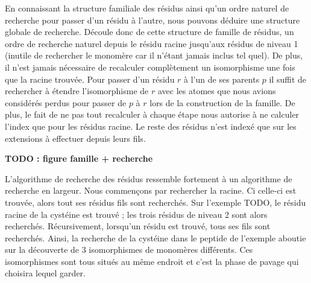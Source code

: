 En connaissant la structure familiale des résidus ainsi qu'un ordre naturel de recherche pour passer d'un résidu à l'autre, nous pouvons déduire une structure globale de recherche.
Découle donc de cette structure de famille de résidus, un ordre de recherche naturel depuis le résidu racine jusqu'aux résidus de niveau 1 (inutile de rechercher le monomère car il n'étant jamais inclus tel quel).
De plus, il n'est jamais nécessaire de recalculer complètement un isomorphisme une fois que la racine trouvée.
Pour passer d'un résidu $r$ à l'un de ses parents $p$ il suffit de rechercher à étendre l'isomorphisme de $r$ avec les atomes que nous avions considérés perdus pour passer de $p$ à $r$ lors de la construction de la famille.
De plus, le fait de ne pas tout recalculer à chaque étape nous autorise à ne calculer l'index que pour les résidus racine.
Le reste des résidus n'est indexé que sur les extensions à effectuer depuis leurs fils.

% 
%   
%   
%     
%   

\textbf{TODO : figure famille + recherche}

L'algorithme de recherche des résidus ressemble fortement à un algorithme de recherche en largeur.
Nous commençons par rechercher la racine.
Ci celle-ci est trouvée, alors tout ses résidus fils sont recherchés.
Sur l'exemple TODO, le résidu racine de la cystéine est trouvé ; les trois résidus de niveau 2 sont alors recherchés.
Récursivement, lorsqu'un résidu est trouvé, tous ses fils sont recherchés.
Ainsi, la recherche de la cystéine dans le peptide de l'exemple aboutie sur la découverte de 3 isomorphismes de monomères différents.
Ces isomorphismes sont tous situés au même endroit et c'est la phase de pavage qui choisira lequel garder.


